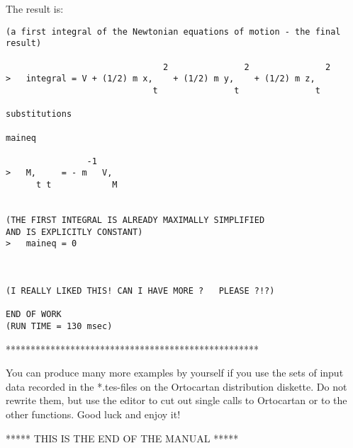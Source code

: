 \bigskip

\noindent The result is:

\bigskip

\begin{verbatim}
(a first integral of the Newtonian equations of motion - the final result)

                               2               2               2
>   integral = V + (1/2) m x,    + (1/2) m y,    + (1/2) m z,
                             t               t               t

substitutions

maineq

                -1
>   M,     = - m   V,
      t t            M


(THE FIRST INTEGRAL IS ALREADY MAXIMALLY SIMPLIFIED
AND IS EXPLICITLY CONSTANT)
>   maineq = 0



(I REALLY LIKED THIS! CAN I HAVE MORE ?   PLEASE ?!?)

END OF WORK
(RUN TIME = 130 msec)
\end{verbatim}

\bigskip

\centerline{***************************************************}

\bigskip

You can produce many more examples by yourself  if  you use the sets of input
data recorded in the *.tes-files on the Ortocartan distribution diskette. Do
not rewrite them, but use the editor to cut out single calls to Ortocartan or
to the other functions. Good luck and enjoy it!

\bigskip

\bigskip

\centerline{***** THIS IS THE END OF THE MANUAL *****}


